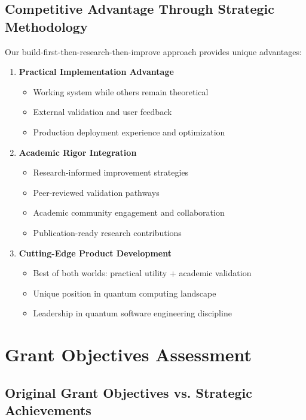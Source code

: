 \documentclass[12pt,a4paper]{article}
\begin{document}
\subsection{Competitive Advantage Through Strategic Methodology}

Our build-first-then-research-then-improve approach provides unique advantages:

\begin{enumerate}
    \item \textbf{Practical Implementation Advantage}
    \begin{itemize}
        \item Working system while others remain theoretical
        \item External validation and user feedback
        \item Production deployment experience and optimization
    \end{itemize}
    
    \item \textbf{Academic Rigor Integration}
    \begin{itemize}
        \item Research-informed improvement strategies
        \item Peer-reviewed validation pathways
        \item Academic community engagement and collaboration
        \item Publication-ready research contributions
    \end{itemize}
    
    \item \textbf{Cutting-Edge Product Development}
    \begin{itemize}
        \item Best of both worlds: practical utility + academic validation
        \item Unique position in quantum computing landscape
        \item Leadership in quantum software engineering discipline
    \end{itemize}
\end{enumerate}

\section{Grant Objectives Assessment}

\subsection{Original Grant Objectives vs. Strategic Achievements}
\end{document}
